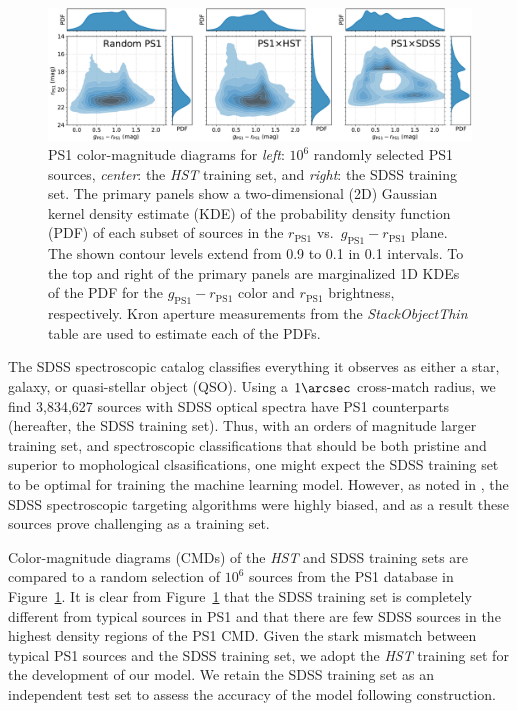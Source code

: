 \documentclass[twocolumn]{aastex62}
\begin{document}
\begin{CJK*}{UTF8}{gbsn}
\begin{figure}[htb]
 \centering
  \includegraphics[width=7.2in]{./Figures/ColorMagDiagram.pdf}
  \caption{ PS1 color-magnitude diagrams for \textit{left}: $10^6$ randomly
  selected PS1 sources, \textit{center}: the \textit{HST} training set, and
  \textit{right}: the SDSS training set. The primary panels show a
  two-dimensional (2D) Gaussian kernel density estimate (KDE) of the
  probability density function (PDF) of each subset of sources in the
  $r_\mathrm{PS1}$ vs.\ $g_\mathrm{PS1} - r_\mathrm{PS1}$ plane. The shown
  contour levels extend from 0.9 to 0.1 in 0.1 intervals. To the top and
  right of the primary panels are marginalized 1D KDEs of the PDF for the
  $g_\mathrm{PS1} - r_\mathrm{PS1}$ color and $r_\mathrm{PS1}$ brightness,
  respectively. Kron aperture measurements from the \textit{StackObjectThin}
  table are used to estimate each of the PDFs. }
  \label{fig:cmd}
\end{figure}

The SDSS spectroscopic catalog classifies everything it observes as either a
star, galaxy, or quasi-stellar object (QSO). Using a $1\arcsec$ cross-match
radius, we find 3,834,627 sources with SDSS optical spectra have PS1
counterparts (hereafter, the SDSS training set). Thus, with an orders of
magnitude larger training set, and spectroscopic classifications that should
be both pristine and superior to mophological clsasifications, one might
expect the SDSS training set to be optimal for training the machine learning
model. However, as noted in \citet{Miller17}, the SDSS spectroscopic
targeting algorithms were highly biased, and as a result these sources prove
challenging as a training set.

Color-magnitude diagrams (CMDs) of the \textit{HST} and SDSS training sets
are compared to a random selection of $10^6$ sources from the PS1 database in
Figure~\ref{fig:cmd}. It is clear from Figure~\ref{fig:cmd} that the SDSS
training set is completely different from typical sources in PS1 and that
there are few SDSS sources in the highest density regions of the PS1 CMD.
Given the stark mismatch between typical PS1 sources and the SDSS training
set, we adopt the \textit{HST} training set for the development of our model.
We retain the SDSS training set as an independent test set to assess the
accuracy of the model following construction.


\end{CJK*}
\end{document}
